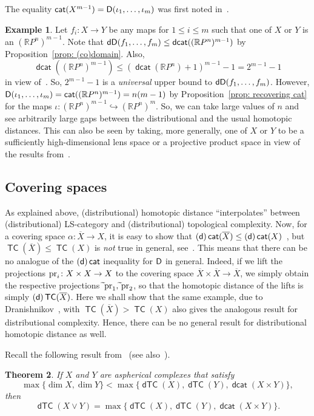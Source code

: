 \documentclass[amscd,amssymb,verbatim,10pt]{amsart}
\numberwithin{equation}{section}
\theoremstyle{plain}
\newtheorem{theorem}{Theorem}[section]
\theoremstyle{definition}
\newtheorem{ex}[theorem]{Example}
\DeclareMathOperator{\cat}{{\mathsf{cat}}}
\DeclareMathOperator{\TC}{{\mathsf{TC}}}
\DeclareMathOperator{\dcat}{{\mathsf{dcat}}}
\DeclareMathOperator{\dTC}{{\mathsf{dTC}}}
\def\pr{\protect\operatorname{pr}}
\def\R{{\mathbb R}}
\newcommand{\D}{{\sf {D}}}
\newcommand{\sd}{{(\sf {d})}}
\newcommand{\dD}{{\sf {dD}}}
\def\wt{\widetilde}
\begin{document}
The equality $\cat(X^{m-1})=\D(\iota_1,\dots,\iota_m)$ was first noted in~\cite{MM,BV}.

\begin{ex}
Let $f_i\colon X\to Y$ be any maps for $1\le i \le m$ such that one of $X$ or $Y$ is 
an $(\R P^n)^{m-1}$.
Note that $\dD(f_1,\dots,f_m)\le\dcat((\R P^n)^{m-1})$ by Proposition~\ref{prop: (co)domain}. Also, 
\[
\dcat((\R P^n)^{m-1})\le(\dcat(\R P^n)+1)^{m-1}-1=2^{m-1}-1
\]
in view of~\cite[Proposition~3.5]{DJ}. So, $2^{m-1}-1$ is a \emph{universal} upper bound to $\dD(f_1,\dots,f_m)$. However, $\D(\iota_1,\dots,\iota_m)=\cat((\R P^n)^{m-1})=n(m-1)$ by Proposition~\ref{prop: recovering cat} for the maps $\iota\colon (\R P^n)^{m-1}\hookrightarrow (\R P^n)^m$. So, we can take large values of $n$ and see arbitrarily large gaps between the distributional and the usual homotopic distances. 
This can also be seen by taking, more generally, one of $X$ or $Y$ to be a sufficiently 
high-dimensional lens space or a projective product space in view of the results from~\cite[Section~8]{JO}.
\end{ex}


\subsection{Covering spaces}
As explained above, (distributional) homotopic distance ``interpolates'' between (distributional) LS-category and (distributional) topological complexity. Now, for a covering space $\alpha\colon \overline X \to X$, it is easy to show that $\sd\cat(\overline X) \leq \sd\cat(X)$~\cite{CLOT,DJ}, but $\TC(\overline X) \leq \TC(X)$ is \emph{not}
true in general, see~\cite{Dr-covering}. This means that there can
be no analogue of the $\sd\cat$ inequality for $\D$ in general. Indeed, if we lift the projections $\pr_i\colon X \times X \to X$
to the covering space $\overline X \times \overline X \to \overline X$, we 
simply obtain the respective projections $\wt \pr_1, \wt \pr_2$, so that the homotopic
distance of the lifts is simply $\sd\TC(\overline X)$. Here we shall show that the 
same example, due to Dranishnikov~\cite{Dr-covering}, with $\TC(\overline X) > \TC(X)$ also gives
the analogous result for distributional complexity. Hence, there
can be no general result for distributional homotopic distance as well.

Recall the following result from~\cite[Subsection 6.3]{DJ} (see also~\cite{Dr}).
\begin{theorem}\label{thm:wedge}
If $X$ and $Y$ are aspherical complexes that satisfy
$$\max \{\dim X, \dim Y\} < \max \{\dTC(X), \dTC(Y), \dcat(X \times Y)\},$$
then 
$$\dTC(X \vee Y) = \max \{\dTC(X), \dTC(Y), \dcat(X \times Y)\}.$$
\end{theorem}
\end{document}
